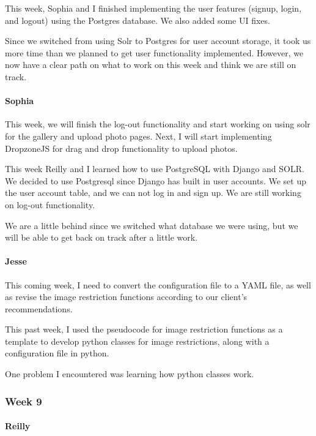 \documentclass[onecolumn, draftclsnofoot,10pt, compsoc]{IEEEtran}
\begin{document}
\begin{flushleft}
 
This week, Sophia and I finished implementing the user features (signup, login, and logout) using the Postgres database. We also added some UI fixes.
 
 
Since we switched from using Solr to Postgres for user account storage, it took us more time than we planned to get user functionality implemented. However, we now have a clear path on what to work on this week and think we are still on track.
 
\paragraph{Sophia}
 
This week, we will finish the log-out functionality and start working on using solr for the gallery and upload photo pages. Next, I will start implementing DropzoneJS for drag and drop functionality to upload photos.
 
 
This week Reilly and I learned how to use PostgreSQL with Django and SOLR. We decided to use Postgresql since Django has built in user accounts. We set up the user account table, and we can not log in and sign up. We are still working on log-out functionality.
 
 
We are a little behind since we switched what database we were using, but we will be able to get back on track after a little work.
 
\paragraph{Jesse}
 
This coming week, I need to convert the configuration file to a YAML file, as well as revise the image restriction functions according to our client's recommendations.
 
 
This past week, I used the pseudocode for image restriction functions as a template to develop python classes for image restrictions, along with a configuration file in python.
 
 
One problem I encountered was learning how python classes work.
 
\subsubsection{Week 9}
\paragraph{Reilly}
 

\end{flushleft}
\end{document}
